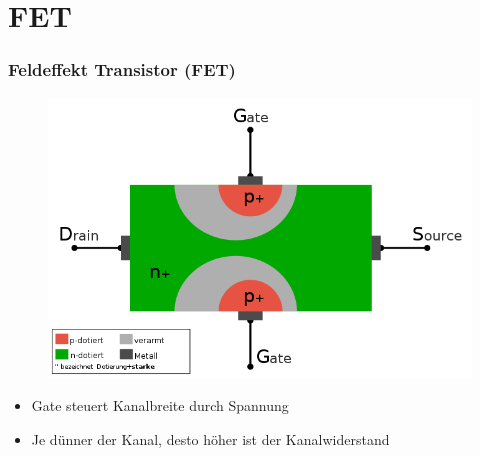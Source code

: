 \section*{FET}
\begin{frame}
  \frametitle{Feldeffekt Transistor (FET)}
  \begin{center}
    \begin{figure}
      \includegraphics[width=\textwidth,height=.6\textheight,keepaspectratio]{a06/FET-aufbau.png}
    \end{figure}
    \begin{itemize}
      \item Gate steuert Kanalbreite durch Spannung
      \item Je dünner der Kanal, desto höher ist der Kanalwiderstand
    \end{itemize}
  \end{center}
\end{frame}

